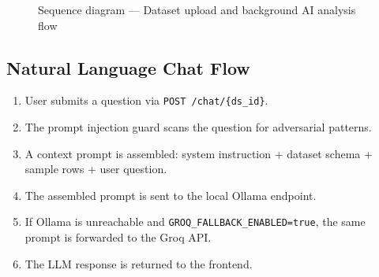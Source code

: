 \documentclass[12pt,a4paper]{report}
\begin{document}
\begin{figure}[H]
\caption{Sequence diagram --- Dataset upload and background AI analysis flow}
\label{fig:seq_dataset}
\end{figure}

\subsection{Natural Language Chat Flow}

\begin{enumerate}[leftmargin=2em]
    \item User submits a question via \texttt{POST /chat/\{ds\_id\}}.
    \item The prompt injection guard scans the question for adversarial patterns.
    \item A context prompt is assembled: system instruction + dataset schema + sample rows + user question.
    \item The assembled prompt is sent to the local Ollama endpoint.
    \item If Ollama is unreachable and \texttt{GROQ\_FALLBACK\_ENABLED=true}, the same prompt is forwarded to the Groq API.
    \item The LLM response is returned to the frontend.
\end{enumerate}
\end{document}
